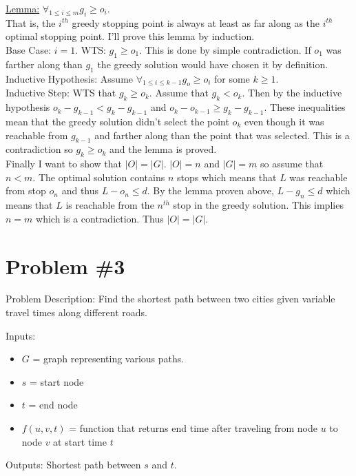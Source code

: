 \documentclass{article}
\begin{document}
\underline{Lemma:} $\forall_{1\le i\le m} g_i \ge o_i$. \\

That is, the $i^{th}$ greedy stopping point is always at least as far along as the $i^{th}$ optimal stopping point. I'll prove this lemma by induction.\\

Base Case: $i=1$. WTS: $g_1 \ge o_1$. This is done by simple contradiction. If $o_1$ was farther along than $g_1$ the greedy solution would have chosen it by definition.\\

Inductive Hypothesis: Assume $\forall_{1\le i\le k-1} g_o \ge o_i$ for some $k\ge 1$. \\

Inductive Step: WTS that $g_k \ge o_k$. Assume that $g_k < o_k$. Then by the inductive hypothesis $o_k - g_{k-1} < g_k - g_{k-1}$ and $o_k - o_{k-1} \ge g_k - g_{k-1}$. These inequalities mean that the greedy solution didn't select the point $o_k$ even though it was reachable from $g_{k-1}$ and farther along than the point that was selected. This is a contradiction so $g_k \ge o_k$ and the lemma is proved.\\

Finally I want to show that $|O|=|G|$. $|O| = n$ and $|G| = m$ so assume that $n < m$. The optimal solution contains $n$ stops which means that $L$ was reachable from stop $o_n$ and thus $L - o_n \le d$. By the lemma proven above, $L - g_n \le d$ which means that $L$ is reachable from the $n^{th}$ stop in the greedy solution. This implies $n=m$ which is a contradiction. Thus $|O| = |G|$.

\section*{Problem \#3}
Problem Description: Find the shortest path between two cities given variable travel times along different roads.

Inputs:
\begin{itemize}
    \item $G$ = graph representing various paths.
    \item $s$ = start node
    \item $t$ = end node
    \item $f(u, v, t)$ = function that returns end time after traveling from node $u$ to node $v$ at start time $t$
\end{itemize}

Outputs: Shortest path between $s$ and $t$.
\end{document}
